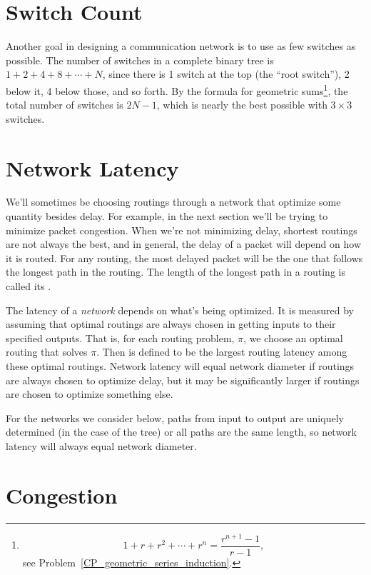 \section{Switch Count}

Another goal in designing a communication network is to use as few
switches as possible.  The number of switches in a complete binary tree is
$1 + 2 + 4 + 8 + \cdots + N$, since there is 1 switch at the top (the
``root switch''), 2 below it, 4 below those, and so forth.  By the
formula for geometric sums\footnote{
\[
1+r+r^2+\cdots+r^n = \frac{r^{n+1}-1}{r-1},
\]
see Problem~\ref{CP_geometric_series_induction}.}, the total number of
switches is $2 N - 1$, which is nearly the best possible with $3 \times 3$
switches.

\section{Network Latency}

We'll sometimes be choosing routings through a network that optimize some
quantity besides delay.  For example, in the next section we'll be trying
to minimize packet congestion.  When we're not minimizing delay, shortest
routings are not always the best, and in general, the delay of a packet
will depend on how it is routed.  For any routing, the most delayed packet
will be the one that follows the longest path in the routing.  The length
of the longest path in a routing is called its .


The latency of a \emph{network} depends on what's being optimized.  It is
measured by assuming that optimal routings are always chosen in getting
inputs to their specified outputs.  That is, for each routing problem,
$\pi$, we choose an optimal routing that solves $\pi$.  Then  is defined to be the largest routing latency among these
optimal routings.  Network latency will equal network diameter if routings
are always chosen to optimize delay, but it may be significantly larger if
routings are chosen to optimize something else.

For the networks we consider below, paths from input to output are
uniquely determined (in the case of the tree) or all paths are the same
length, so network latency will always equal network diameter.


\section{Congestion}

